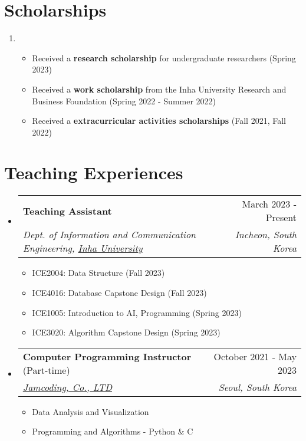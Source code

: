 \documentclass[letterpaper,11pt]{article}
\makeatletter
\newcommand{\resumeSubheading}[4]{
  \vspace{-1pt}\item
    \begin{tabular*}{0.97\textwidth}{l@{\extracolsep{\fill}}r}
      #1 & #2 \\
      \textit{\small#3} & \textit{\small #4} \\
    \end{tabular*}\vspace{-5pt}
}
\makeatother
\begin{document}
    \section{Scholarships}
    \begin{enumerate}[noitemsep, leftmargin=*,label=]
        \item{
            \begin{itemize}[label=\bullet]
                \item{Received a \textbf{research scholarship} for undergraduate researchers (Spring 2023)}
                \item{Received a \textbf{work scholarship} from the Inha University Research and Business Foundation (Spring 2022 - Summer 2022)}
                \item{Received a \textbf{extracurricular activities scholarships} (Fall 2021, Fall 2022)}
                
            \end{itemize}
        }
    \end{enumerate}

    \section{Teaching Experiences}
    \begin{itemize}[leftmargin=*,label=]
        \resumeSubheading
        {\textbf{Teaching Assistant}}{March 2023 - Present}
            {Dept. of Information and Communication Engineering, \href{https://eng.inha.ac.kr/eng/index.do}{Inha University}}{Incheon, South Korea}
            
            \begin{itemize}[label=\bullet]
                \item{
                    ICE2004: Data Structure (Fall 2023)
                }
                \item{
                    ICE4016: Database Capstone Design (Fall 2023)
                }
                \item{
                    ICE1005: Introduction to AI,  Programming (Spring 2023)
                }
                \item{
                    ICE3020: Algorithm Capstone Design (Spring 2023)
                }
            \end{itemize}
            

        \resumeSubheading
        {\textbf{Computer Programming Instructor} (Part-time)}{October 2021 - May 2023}
            {\href{https://jamcoding.co.kr/}{Jamcoding, Co., LTD}}{Seoul, South Korea}
            \begin{itemize}[label=\bullet]
                \item{Data Analysis and Visualization}
                \item{Programming and Algorithms - Python \& C}
            \end{itemize}
    \end{itemize}
\end{document}
